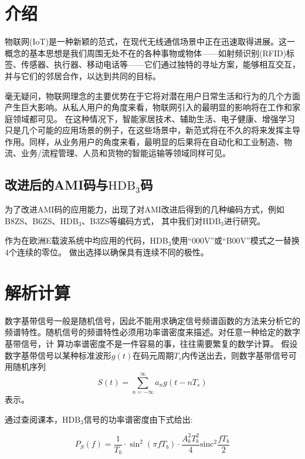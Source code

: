 \documentclass[AutoFakeBold]{LZUThesis}
\begin{document}
\section{介绍}

物联网(IoT)是一种新颖的范式，在现代无线通信场景中正在迅速取得进展。这一概念的基本思想是我们周围无处不在的各种事物或物体——如射频识别(RFID)标签、传感器、执行器、移动电话等——它们通过独特的寻址方案，能够相互交互，并与它们的邻居合作，以达到共同的目标。

毫无疑问，物联网理念的主要优势在于它将对潜在用户日常生活和行为的几个方面产生巨大影响。从私人用户的角度来看，物联网引入的最明显的影响将在工作和家庭领域都可见。
在这种情况下，智能家居技术、辅助生活、电子健康、增强学习只是几个可能的应用场景的例子，在这些场景中，新范式将在不久的将来发挥主导作用。同样，从业务用户的角度来看，最明显的后果将在自动化和工业制造、物流、业务/流程管理、人员和货物的智能运输等领域同样可见。

\subsection{改进后的AMI码与$\mathrm{HDB_3}$码}

为了改进AMI码的应用能力，出现了对AMI改进后得到的几种编码方式，例如B8ZS、B6ZS、$\mathrm{HDB_3}$、B3ZS等编码方式，
其中我们对$\mathrm{HDB_3}$进行研究。

作为在欧洲E载波系统中均应用的代码，$\mathrm{HDB_3}$使用“000V”或“B00V”模式之一替换4个连续的零位。
做出选择以确保具有连续不同的极性。\cite{enwiki:1}

\section{解析计算}

数字基带信号一般是随机信号，因此不能用求确定信号频谱函数的方法来分析它的频谱特性。随机信号的频谱特性必须用功率谱密度来描述。对任意一种给定的数字基带信号，计
算功率谱密度不是一件容易的事，往往需要繁复的数学计算。
假设数字基带信号以某种标准波形$g(t)$在码元周期$ T_s $内传送出去，则数字基带信号可用随机序列
\begin{equation}
    S(t) = \sum\limits^{\infty}_{n = -\infty} a_n g(t - nT_s)
\end{equation}
表示。

通过查阅课本\cite{POCBook}，$\mathrm{HDB_3}$信号的功率谱密度由下式给出:

\begin{equation}
    P_S(f) = \frac{1}{T_b} \cdot \sin^2{(\pi f T_b)} \cdot \frac{A_b^2T_b^2}{4}  \mathrm{sinc}^2{\frac{f T_b}{2}}
\end{equation}
\end{document}

